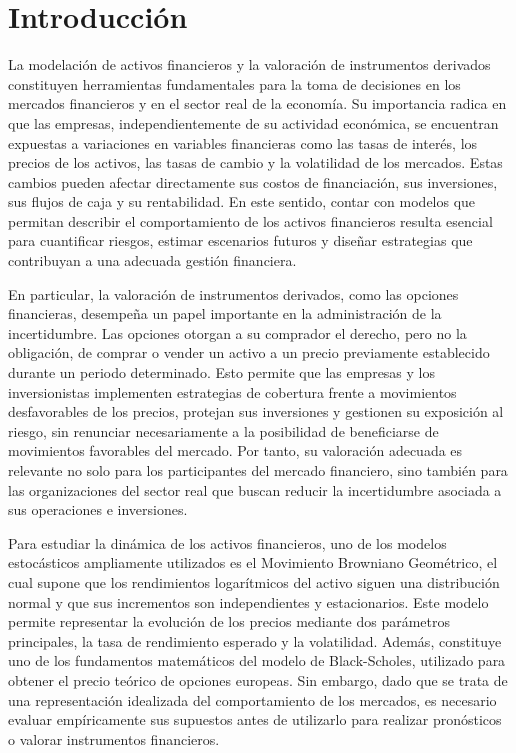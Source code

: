 \documentclass{article}
\begin{document}
\section*{Introducción}
La modelación de activos financieros y la valoración de instrumentos derivados constituyen herramientas fundamentales para la toma de decisiones en los mercados financieros y en el sector real de la economía. Su importancia radica en que las empresas, independientemente de su actividad económica, se encuentran expuestas a variaciones en variables financieras como las tasas de interés, los precios de los activos, las tasas de cambio y la volatilidad de los mercados. Estas cambios pueden afectar directamente sus costos de financiación, sus inversiones, sus flujos de caja y su rentabilidad. En este sentido, contar con modelos que permitan describir el comportamiento de los activos financieros resulta esencial para cuantificar riesgos, estimar escenarios futuros y diseñar estrategias que contribuyan a una adecuada gestión financiera.

En particular, la valoración de instrumentos derivados, como las opciones financieras, desempeña un papel importante en la administración de la incertidumbre. Las opciones otorgan a su comprador el derecho, pero no la obligación, de comprar o vender un activo a un precio previamente establecido durante un periodo determinado. Esto permite que las empresas y los inversionistas implementen estrategias de cobertura frente a movimientos desfavorables de los precios, protejan sus inversiones y gestionen su exposición al riesgo, sin renunciar necesariamente a la posibilidad de beneficiarse de movimientos favorables del mercado. Por tanto, su valoración adecuada es relevante no solo para los participantes del mercado financiero, sino también para las organizaciones del sector real que buscan reducir la incertidumbre asociada a sus operaciones e inversiones.

Para estudiar la dinámica de los activos financieros, uno de los modelos estocásticos ampliamente utilizados es el Movimiento Browniano Geométrico, el cual supone que los rendimientos logarítmicos del activo siguen una distribución normal y que sus incrementos son independientes y estacionarios. Este modelo permite representar la evolución de los precios mediante dos parámetros principales, la tasa de rendimiento esperado y la volatilidad. Además, constituye uno de los fundamentos matemáticos del modelo de Black-Scholes, utilizado para obtener el precio teórico de opciones europeas. Sin embargo, dado que se trata de una representación idealizada del comportamiento de los mercados, es necesario evaluar empíricamente sus supuestos antes de utilizarlo para realizar pronósticos o valorar instrumentos financieros.
\end{document}
